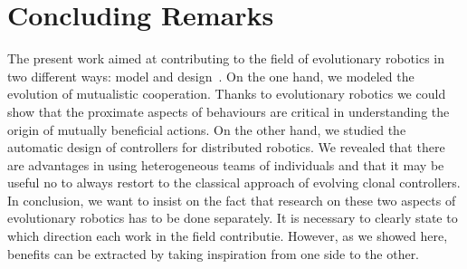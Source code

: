 \section{Concluding Remarks}

	The present work aimed at contributing to the field of evolutionary robotics in two different ways: model and design~\parencite{Trianni2014b, Doncieux2015a}. On the one hand, we modeled the evolution of mutualistic cooperation. Thanks to evolutionary robotics we could show that the proximate aspects of behaviours are critical in understanding the origin of mutually beneficial actions. On the other hand, we studied the automatic design of controllers for distributed robotics. We revealed that there are advantages in using heterogeneous teams of individuals and that it may be useful no to always restort to the classical approach of evolving clonal controllers. In conclusion, we want to insist on the fact that research on these two aspects of evolutionary robotics has to be done separately. It is necessary to clearly state to which direction each work in the field contributie. However, as we showed here, benefits can be extracted by taking inspiration from one side to the other. 


